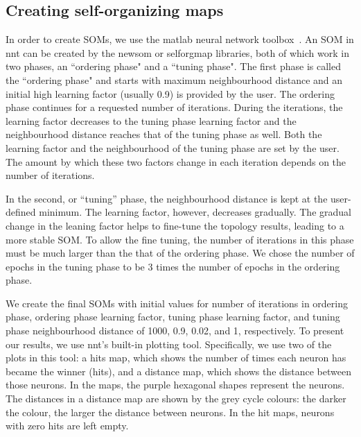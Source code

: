 \subsection{Creating self-organizing maps}
\label{sec: create_som}
     In order to create SOMs, we use the {\sc matlab} neural network toolbox~\citep[NNT,][]{matlabtolbox}. 
     An SOM in {\sc nnt} can be created by the {\sc newsom} or {\sc selforgmap} libraries, both of which work in two phases, an ``ordering phase" and a ``tuning phase". 
     The first phase is called the ``ordering phase" and
     starts with maximum neighbourhood distance and an initial high learning factor (usually 0.9) is provided by the user. 
     The ordering phase continues for a requested number of iterations.
     During the iterations, the learning factor decreases to the tuning phase learning factor and the neighbourhood distance reaches that of the tuning phase as well.
     Both the learning factor and the neighbourhood of the tuning phase are set by the user. 
     The amount by which these two factors change in each iteration depends on the number of iterations.
     
     In the second, or ``tuning'' phase,
     the neighbourhood distance is kept at the user-defined minimum.
     The learning factor, however, decreases gradually.
     The gradual change in the leaning factor helps to fine-tune the topology results, leading to a more stable SOM. 
     To allow the fine tuning, the number of iterations in this phase must be much larger than the that of the ordering phase. 
     We chose the number of epochs in the tuning phase to be 3 times the number of epochs in the ordering phase.
     
     We create the final SOMs with initial values for number of iterations in ordering phase, ordering phase learning factor, tuning phase learning factor, and tuning phase neighbourhood distance of 1000, 0.9, 0.02, and 1, respectively. 
     To present our results, we use {\sc nnt}'s built-in plotting tool.
     Specifically, we use two of the plots in this tool: a hits map, which shows the number of times each neuron has became the winner (hits), and a distance map, which shows the distance between those neurons.
     In the maps, the purple hexagonal shapes represent the neurons. 
     The distances in a distance map are shown by the grey cycle colours:
     the darker the colour, the larger the distance between neurons.
     In the hit maps, neurons with zero hits are left empty.
      
    
   
